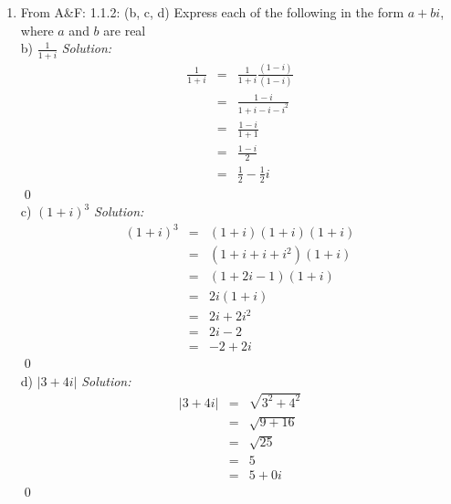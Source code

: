 \documentclass[10pt]{amsart}
\theoremstyle{nonumberplain}
\begin{document}
\begin{enumerate}[label={\bf {\arabic*}:}]
\item From A\&F: 1.1.2: (b, c, d)
Express each of the following in the form $a + bi$, where $a$ and $b$ are real \\
b) $\frac{1}{1 + i}$
\textit{Solution:}
\begin{eqnarray*}
\frac{1}{1 + i} &=& \frac{1}{1 + i} \frac{(1 - i)}{(1 - i)} \\
		     &=& \frac{1 - i}{1 + i - i - i^2} \\
		     &=& \frac{1 - i}{1 + 1} \\
		     &=& \frac{1 - i}{2} \\
		     &=& \frac{1}{2} - \frac{1}{2}i
\end{eqnarray*}
\qed \\
c) $(1 + i)^3$
\textit{Solution:}
\begin{eqnarray*}
(1 + i)^3 &=& (1 + i)(1 + i)(1 + i) \\
              &=& (1 + i + i + i^2)(1 + i) \\ 
              &=& (1 + 2i - 1)(1 + i) \\
              &=& 2i(1 + i) \\
              &=& 2i + 2i^2 \\
              &=& 2i - 2 \\
              &=& -2 + 2i
\end{eqnarray*}
\qed \\
d) $|3 + 4i|$
\textit{Solution:}
\begin{eqnarray*}
|3 + 4i| &=& \sqrt{3^2 + 4^2} \\
              &=& \sqrt{9 + 16} \\ 
              &=& \sqrt{25} \\
              &=& 5 \\
              &=& 5 + 0i
\end{eqnarray*}
\qed \\



\end{enumerate}
\end{document}
